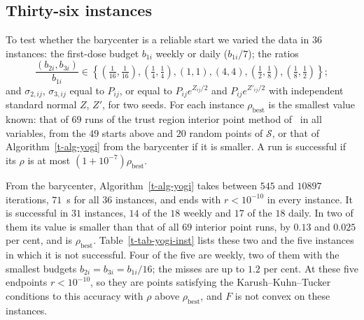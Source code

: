 \documentclass[11pt]{article}
\theoremstyle{plain}
\theoremstyle{remark}
\numberwithin{equation}{section}
\begin{document}
\subsection{Thirty-six instances}

To test whether the barycenter is a reliable start we varied the data in $36$
instances: the first-dose budget $b_{1i}$ weekly or daily ($b_{1i}/7$); the
ratios
\begin{equation}
\frac{(b_{2i},b_{3i})}{b_{1i}}\in\left\{\left(\tfrac1{16},\tfrac1{16}\right),\left(\tfrac14,\tfrac14\right),(1,1),(4,4),\left(\tfrac12,\tfrac18\right),\left(\tfrac18,\tfrac12\right)\right\};
\end{equation}
and $\sigma_{2,ij}$, $\sigma_{3,ij}$ equal to $P_{ij}$, or equal to
$P_{ij}e^{Z_{ij}/2}$ and $P_{ij}e^{Z'_{ij}/2}$ with independent standard
normal $Z$, $Z'$, for two seeds. For each instance $\rho_{\mathrm{best}}$ is
the smallest value known: that of $69$ runs of the trust region interior point
method of~\cite{1999Byrd_Hribar_Nocedal} in all variables, from the $49$
starts above and $20$ random points of $\mathcal{S}$, or that of
Algorithm~\ref{t-alg-yogi} from the barycenter if it is smaller. A run is
successful if its $\rho$ is at most $(1+10^{-7})\rho_{\mathrm{best}}$.

From the barycenter, Algorithm~\ref{t-alg-yogi} takes between $545$ and
$10897$ iterations, $71$~s for all $36$ instances, and ends with $r<10^{-10}$
in every instance. It is successful in $31$ instances, $14$ of the $18$
weekly and $17$ of the $18$ daily. In two of them its value is smaller than
that of all $69$ interior point runs, by $0.13$ and $0.025$ per cent, and is
$\rho_{\mathrm{best}}$. Table~\ref{t-tab-yogi-inst} lists these two and the
five instances in which it is not successful. Four of the five are weekly,
two of them with the smallest budgets $b_{2i}=b_{3i}=b_{1i}/16$; the misses are
up to $1.2$ per cent. At these five endpoints $r<10^{-10}$, so they are points
satisfying the Karush--Kuhn--Tucker conditions to this accuracy with $\rho$
above $\rho_{\mathrm{best}}$, and $F$ is not convex on these instances.
\end{document}

